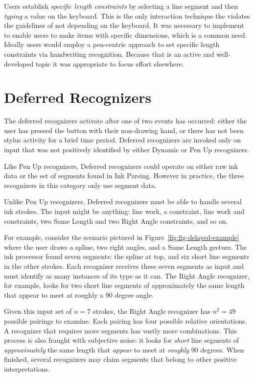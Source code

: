 Users establish \textit{specific length constraints} by selecting a
line segment and then \textit{typing} a value on the keyboard. This is
the only interaction technique the violates the guidelines of not
depending on the keyboard. It was necessary to implement to enable
users to make items with specific dimensions, which is a common
need. Ideally users would employ a pen-centric approach to set
specific length constraints via handwriting recognition. Because that
is an active and well-developed topic it was appropriate to focus
effort elsewhere.

\section{Deferred Recognizers}

The deferred recognizers activate after one of two events has occurred:
either the user has pressed the button with their non-drawing hand, or
there has not been stylus activity for a brief time period. Deferred
recognizers are invoked only on input that was not positively
identified by either Dynamic or Pen Up recognizers.

Like Pen Up recognizers, Deferred recognizers could operate on either
raw ink data or the set of segments found in Ink Parsing. However in
practice, the three recognizers in this category only use segment
data.

Unlike Pen Up recognizers, Deferred recognizers must be able to handle
several ink strokes. The input might be anything: line work, a
constraint, line work and constraints, two Same Length and two Right
Angle constraints, and so on. 



For example, consider the scenario pictured in
Figure~\ref{fig:fig-delayed-example} where the user draws a spline,
two right angles, and a Same Length gesture. The ink processor found
seven segments: the spline at top, and six short line segments in the
other strokes. Each recognizer receives these seven segments as input
and must identify as many instances of its type as it can. The Right
Angle recognizer, for example, looks for two short line segments of
approximately the same length that appear to meet at roughly a 90
degree angle.

Given this input set of $n=7$ strokes, the Right Angle recognizer has
$n^2=49$ possible pairings to examine. Each pairing has four possible
relative orientations. A recognizer that requires more segments has
vastly more combinations. This process is also fraught with subjective
noise: it looks for \textit{short} line segments of
\textit{approximately} the same length that \textit{appear} to meet at
\textit{roughly} 90 degrees. When finished, several recognizers may
claim segments that belong to other positive interpretations.

